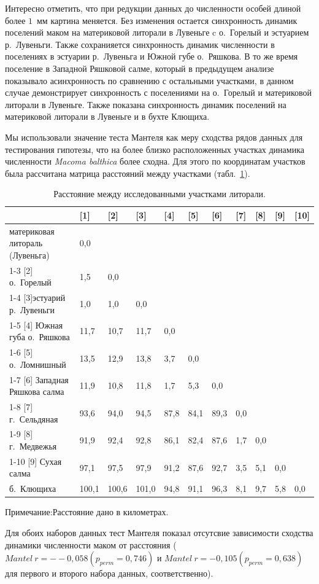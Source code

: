 Интересно отметить, что при редукции данных до численности особей длиной более $1$~мм картина меняется.
Без изменения остается синхронность динамик поселений маком на материковой литорали в Лувеньге c о.~Горелый и эстуарием р.~Лувеньги.
Также сохранияется синхронность динамик численности в поселениях в эстуарии р.~Лувеньга и Южной губе о.~Ряшкова.
В то же время поселение в Западной Ряшковой салме, который в предыдущем анализе показывало асинхронность по сравнению с остальными участками, в данном случае демонстрирует синхронность с поселениями на о.~Горелый и материковой литорали в Лувеньге.
Также показана синхронность динамик поселений на материковой литорали в Лувеньге и в бухте Клющиха.

Мы использовали значение теста Мантеля как меру сходства рядов данных для тестирования гипотезы, что на более близко расположенных участках динамика численности {\it Macoma balthica} более сходна.
Для этого по координатам участков была рассчитана матрица расстояний между участками (табл.~\ref{tab:distance_area_km}).
	\begin{table}[p]
	\caption{Расстояние между исследованными участками литорали.}
	\label{tab:distance_area_km}
        \begin{tabular}{|p{}|*{10}{p{}|}} \hline
	 & [1] & [2] & [3] & [4] & [5] & [6] & [7] & [8] & [9] & [10]
	\\ \hline
	[1] материковая литораль (Лувеньга) & 0,0 &  &  &  &  &  &  &  &  & 
	\\ \cline{1-3}
	[2] о.~Горелый & 1,5 & 0,0 &  &  &  &  &  &  &  &  
	\\ \cline{1-4}
	[3]эстуарий р.~Лувеньги & 1,0 & 1,0 & 0,0 &  &  &  &  &  &  &  
	\\ \cline{1-5}
	[4] Южная губа о.~Ряшкова & 11,7 & 10,7 & 11,7 & 0,0 &  &  &  &  &  & 
	\\ \cline{1-6}
	[5] о.~Ломнишный & 13,5 & 12,9 & 13,8 & 3,7 & 0,0 &  &  &  &  &  
	\\ \cline{1-7}
	[6] Западная Ряшкова салма & 11,9 & 10,8 & 11,8 & 1,7 & 5,3 & 0,0 &  &  &  &  
	\\ \cline{1-8}
	[7] г.~Сельдяная & 93,6 & 94,0 & 94,5 & 87,8 & 84,1 & 89,3 & 0,0 &  &  &  
	\\ \cline{1-9}
	[8] г.~Медвежья & 91,9 & 92,4 & 92,8 & 86,1 & 82,4 & 87,6 & 1,7 & 0,0 &  &  
	\\ \cline{1-10}
	[9] Сухая салма & 97,1 & 97,5 & 97,9 & 91,2 & 87,6 & 92,7 & 3,5 & 5,1 & 0,0 &  
	\\ \hline
	[10] б.~Клющиха & 100,1 & 100,6 & 101,0 & 94,8 & 91,1 & 96,3 & 8,1 & 9,7 & 5,8 & 0,0
	\\ \hline
	\end{tabular}
	   {\footnotesize Примечание:Расстояние дано в километрах.}
	\end{table}

Для обоих наборов данных тест Мантеля показал отсутсвие зависимости сходства динамики численности маком от расстояния ( $Mantel\ r = --0,058 (p_{perm} = 0,746)$ и $Mantel\ r = -0,105 (p_{perm} = 0,638)$ для первого и второго набора данных, соответственно).

\afterpage{\clearpage}
